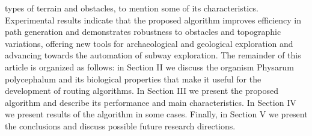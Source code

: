 \documentclass[conference]{IEEEtran}
\begin{document}
        types of terrain and obstacles, to mention some of its characteristics. Experimental results indicate that the proposed algorithm improves efficiency in 
        path generation and demonstrates robustness to obstacles and topographic variations, offering new tools for archaeological and geological exploration 
        and advancing towards the automation of subway exploration.
    \vskip 0.2cm
    The remainder of this article is organized as follows: in Section II we discuss the organism Physarum polycephalum and its biological 
        properties that make it useful for the development of routing algorithms. In Section III we present the proposed algorithm and describe 
        its performance and main characteristics. In Section IV we present results of the algorithm in some cases. 
        Finally, in Section V we present the conclusions and discuss possible future research directions. 




\end{document}
